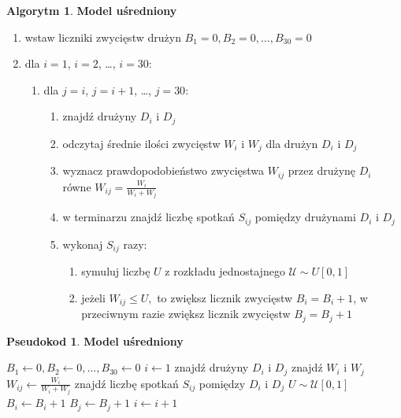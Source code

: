 \documentclass[inzynierska]{pwr_wmat_praca_dyplomowa}
\theoremstyle{plain}
\numberwithin{theorem}{chapter}
\theoremstyle{definition}
\numberwithin{theorem}{chapter}
\newtheorem{algorytm}[theorem]{Algorytm}
\newtheorem{pseudokod}[theorem]{Pseudokod}
\begin{document}
\begin{algorytm} \label{algorytm1}
	\textbf{Model uśredniony}
	\begin{enumerate}
	\item wstaw liczniki zwycięstw drużyn $B_1= 0,B_2= 0,\dots, B_{30}= 0$
	\item dla $i=1$, $i=2$, \dots, $i=30$: 
	\begin{enumerate}
		\item dla $j=i$, $j=i+1$, \dots, $j=30$: 
		\begin{enumerate}
			\item znajdź drużyny $D_i$ i $D_j$
		\item odczytaj średnie ilości zwycięstw $W_i$ i $W_j$ dla drużyn $D_i$ i $D_j$ 
		\item wyznacz prawdopodobieństwo zwycięstwa $W_{ij}$ przez drużynę  $D_i$ równe $W_{ij}=\frac{W_i}{W_i + W_j}$   
		\item w terminarzu znajdź liczbę spotkań $S_{ij}$ pomiędzy drużynami $D_i$ i $D_j$
		\item wykonaj $S_{ij}$ razy:
			\begin{enumerate}
				\item symuluj liczbę $U$ z rozkładu jednostajnego $\mathcal{U}\sim U[0,1]$ 
			\item jeżeli $W_{ij} \leq U,$ to zwiększ licznik zwycięstw $B_i=B_i+1$, w przeciwnym razie zwiększ licznik zwycięstw $B_j=B_j+1$
			\end{enumerate}
		\end{enumerate}
	\end{enumerate}
\end{enumerate}
\end{algorytm} 
 
\begin{pseudokod} \label{pseudokod1}
	\textbf{Model uśredniony}
	\begin{algorithmic}[1]
		\State $B_1\gets 0,B_2\gets 0,\dots, B_{30}\gets 0$
		\State $i\gets 1$
		\State znajdź drużyny $D_i$ i $D_j$
		\State znajdź $W_i$ i $W_j$ 
		\State $W_{ij}\gets\frac{W_i}{W_i + W_j}$
		\State znajdź liczbę spotkań $S_{ij}$ pomiędzy $D_i$ i $D_j$
		\State $U\sim \mathcal{U}[0,1]$
		\State $B_i \gets B_i+1$
		\Else
		\State $B_j \gets B_j+1$
		\EndIf
		\EndFor
		\EndFor
		\State $i\gets i+1$
		\EndWhile
	\end{algorithmic}
\end{pseudokod}
\end{document}
